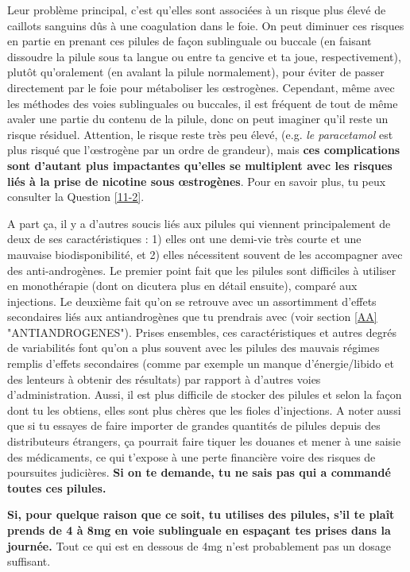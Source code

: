\documentclass{article}
\begin{document}
Leur problème principal, c'est qu'elles sont associées à un risque plus élevé de caillots sanguins dûs à une coagulation dans le foie. On peut diminuer ces risques en partie en prenant ces pilules de façon sublinguale ou buccale (en faisant dissoudre la pilule sous ta langue ou entre ta gencive et ta joue, respectivement), plutôt qu'oralement (en avalant la pilule normalement), pour éviter de passer directement par le foie pour métaboliser les œstrogènes. Cependant, même avec les méthodes des voies sublinguales ou buccales, il est fréquent de tout de même avaler une partie du contenu de la pilule, donc on peut imaginer qu'il reste un risque résiduel. Attention, le risque reste très peu élevé, (e.g. \textit{le paracetamol} est plus risqué que l'œstrogène par un ordre de grandeur), mais \textbf{ces complications sont d'autant plus impactantes qu'elles se multiplent avec les risques liés à la prise de nicotine sous œstrogènes}. Pour en savoir plus, tu peux consulter la Question \ref{11-2}. 

A part ça, il y a d'autres soucis liés aux pilules qui viennent principalement de deux de ses caractéristiques : 1) elles ont une demi-vie très courte et une mauvaise biodisponibilité, et 2) elles nécessitent souvent de les accompagner avec des anti-androgènes. Le premier point fait que les pilules sont difficiles à utiliser en monothérapie (dont on dicutera plus en détail ensuite), comparé aux injections. Le deuxième fait qu'on se retrouve avec un assortimment d'effets secondaires liés aux antiandrogènes que tu prendrais avec (voir section \ref{AA} "ANTIANDROGENES"). Prises ensembles, ces caractéristiques et autres degrés de variabilités font qu'on a plus souvent avec les pilules des mauvais régimes remplis d'effets secondaires (comme par exemple un manque d'énergie/libido et des lenteurs à obtenir des résultats) par rapport à d'autres voies d'administration. Aussi, il est plus difficile de stocker des pilules et selon la façon dont tu les obtiens, elles sont plus chères que les fioles d'injections. A noter aussi que si tu essayes de faire importer de grandes quantités de pilules depuis des distributeurs étrangers, ça pourrait faire tiquer les douanes et mener à une saisie des médicaments, ce qui t'expose à une perte financière voire des risques de poursuites judicières. \textbf{Si on te demande, tu ne sais pas qui a commandé toutes ces pilules.}

\textbf{Si, pour quelque raison que ce soit, tu utilises des pilules, s'il te plaît prends de 4 à 8mg en voie sublinguale en espaçant tes prises dans la journée.} Tout ce qui est en dessous de 4mg n'est probablement pas un dosage suffisant.
\end{document}
